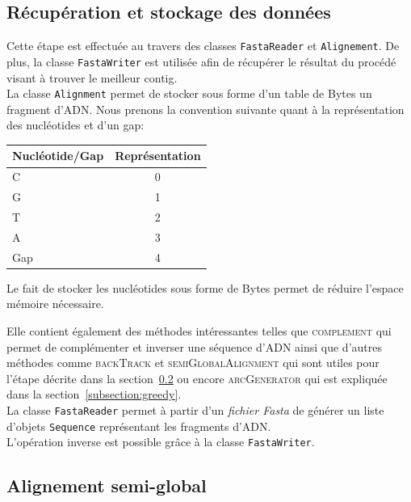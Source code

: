 \subsection{Récupération et stockage des données}
\label{subsection:recStock}

Cette étape est effectuée au travers des classes \verb|FastaReader| et \verb|Alignement|. De plus, la classe \verb|FastaWriter| est utilisée afin de récupérer le résultat du procédé visant à trouver le meilleur contig.\\

La classe \verb|Alignment| permet de stocker sous forme d'un table de Bytes un fragment d'ADN. Nous prenons la convention suivante quant à la représentation des nucléotides et d'un gap:
	\begin{center}
		\begin{tabular}{|l|c|}
			\hline
			Nucléotide/Gap & Représentation \\
			\hline
			\hline
			C & 0 \\
			\hline
			G & 1\\
			\hline
			T &  2 \\
			\hline
			A &  3 \\
			\hline
			Gap & 4 \\
			\hline

		\end{tabular}
	\end{center}

	Le fait de stocker les nucléotides sous forme de Bytes permet de réduire l'espace mémoire nécessaire.

	  Elle contient également des méthodes intéressantes telles que \textsc{complement} qui permet de complémenter et inverser une séquence d'ADN ainsi que d'autres méthodes comme \textsc{backTrack} et \textsc{semiGlobalAlignment} qui sont utiles pour l'étape décrite dans la section~\ref{subsection:semiGlobal} ou encore \textsc{arcGenerator} qui est expliquée dans la section~\ref{subsection:greedy}.\\

La classe \verb|FastaReader| permet à partir d'un \emph{fichier Fasta} de générer un liste d'objets \verb|Sequence| représentant les fragments d'ADN. \\

L'opération inverse est possible grâce à la classe \verb|FastaWriter|.





\subsection{Alignement semi-global}
\label{subsection:semiGlobal}

